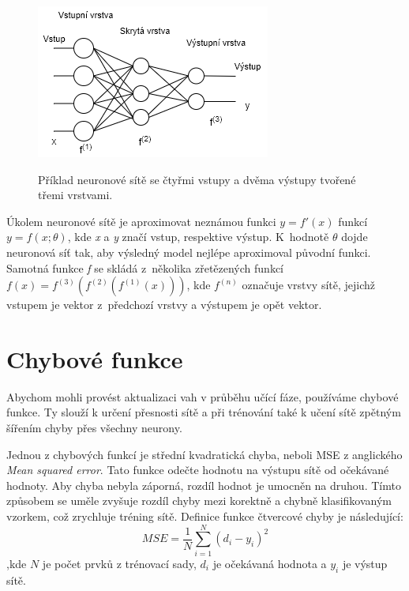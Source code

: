 \begin{figure}[h]\centering
    \centering
    \includegraphics[width=0.6\linewidth]{obrazky/NNSchema.png}\\[1pt]  
    \caption{Příklad neuronové sítě se čtyřmi vstupy a dvěma výstupy tvořené třemi vrstvami. }    
    \label{obrazekSchemaNeuronoveSite}
\end{figure}

Úkolem neuronové sítě je aproximovat neznámou funkci $ y=f'(x)$
funkcí $ y=f(x;\theta )$, kde \emph{x} a \emph{y} značí vstup, 
respektive výstup.
K~hodnotě $\theta$ dojde neuronová síť tak,
aby výsledný model nejlépe aproximoval původní funkci.
Samotná funkce \emph{f} se skládá z~několika zřetězených funkcí 
$f(x)=f^{(3)}(f^{(2)}(f^{(1)}(x)))$,
kde $f^{(n)}$ označuje vrstvy sítě, 
jejichž vstupem je vektor z~předchozí vrstvy 
a výstupem je opět vektor.\cite{Goodfellow-et-al-2016}
\par

\section{Chybové funkce}
Abychom mohli provést aktualizaci vah v průběhu učící fáze,
používáme chybové funkce.
Ty slouží k určení přesnosti sítě
a při trénování také k učení sítě zpětným šířením chyby přes všechny neurony.
\par
Jednou z chybových funkcí je střední kvadratická chyba,
neboli MSE z anglického \emph{Mean squared error}.
Tato funkce odečte hodnotu na výstupu sítě od očekávané hodnoty.
Aby chyba nebyla záporná, rozdíl hodnot je umocněn na druhou.
Tímto způsobem se uměle zvyšuje rozdíl chyby mezi korektně
a chybně klasifikovaným vzorkem,
což zrychluje tréning sítě.
Definice funkce čtvercové chyby je následující:
\begin{equation}
    MSE = \frac{1}{N} \sum^{N}_{i=1}(d_i - y_i)^2 
\end{equation}
,kde $N$ je počet prvků z trénovací sady, $d_i$ je očekávaná hodnota a $y_i$ je výstup sítě.
\par


